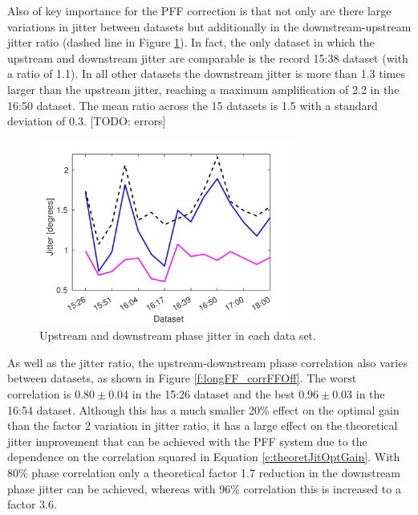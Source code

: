 Also of key importance for the PFF correction is that not only are there large variations in jitter between datasets but additionally in the downstream-upstream jitter ratio (dashed line in Figure \ref{f:longFF_jitFFOff}). In fact, the only dataset in which the upstream and downstream jitter are comparable is the record 15:38 dataset (with a ratio of 1.1). In all other datasets the downstream jitter is more than 1.3 times larger than the upstream jitter, reaching a maximum amplification of 2.2 in the 16:50 dataset. The mean ratio across the 15 datasets is 1.5 with a standard deviation of 0.3. [TODO: errors]

\begin{figure}
  \centering
  \includegraphics[width=0.75\textwidth]{Figures/feedforward/longFF_jitDatSetFFOff}
  \caption{Upstream and downstream phase jitter in each data set.}
  \label{f:longFF_jitFFOff}
\end{figure}

As well as the jitter ratio, the upstream-downstream phase correlation also varies between datasets, as shown in Figure \ref{f:longFF_corrFFOff}. The worst correlation is \(0.80\pm0.04\) in the 15:26 dataset and the best \(0.96\pm0.03\) in the 16:54 dataset. Although this has a much smaller 20\% effect on the optimal gain than the factor 2 variation in jitter ratio, it has a large effect on the theoretical jitter improvement that can be achieved with the PFF system due to the dependence on the correlation squared in Equation \ref{e:theoretJitOptGain}. With 80\% phase correlation only a theoretical factor 1.7 reduction in the downstream phase jitter can be achieved, whereas with 96\% correlation this is increased to a factor 3.6. 

